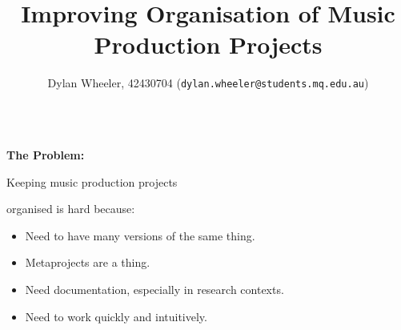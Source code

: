 \documentclass[unknownkeysallowed,usepdftitle=false, parskip=full]{beamer}
\title{Improving Organisation of Music Production Projects}
\author{Dylan Wheeler, 42430704 (\texttt{dylan.wheeler@students.mq.edu.au})}
\institute{Macquarie University}
\newcommand{\secvariable}{nothing}
\newcommand{\mysection}[1]{\renewcommand{\secvariable}{#1}
}
\begin{document}
\mysection{abstract}
\begin{frame}\label{\secvariable}






\begin{columns}
    \begin{column}{0.4\textwidth}
    \parbox{\linewidth}{
    \textbf{The Problem:}

    \vspace{12pt}

    Keeping music production projects
    
    organised is hard because:
    \begin{itemize}
        \item Need to have many versions of the same thing.
        \item Metaprojects are a thing.
        \item Need documentation, especially in research contexts.
        \item Need to work quickly and intuitively.
    \end{itemize}
    }
    \end{column}


\end{columns}
\end{frame}
\end{document}
